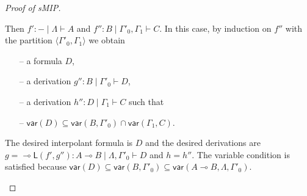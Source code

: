 \documentclass[sn-mathphys-num]{sn-jnl}%
\newcommand{\GG}{\Gamma}
\newcommand{\GL}{\Lambda}
\newcommand{\vd}{\vdash}
\newcommand{\lolli}{\multimap}
\newcommand{\lleft}{{\lolli}\mathsf{L}}
\newcommand{\mf}[1]{\mathsf{#1}}
\newcommand{\vars}[1]{\mf{var} (#1)}
\newcommand{\sMIP}{\textsf{sMIP}}
\theoremstyle{thmstyleone}%
\theoremstyle{thmstyletwo}%
\theoremstyle{thmstylethree}%
\begin{document}
\begin{proof}[Proof of \sMIP]
\begin{itemize}
    Then $f' : {-} \mid \GL \vd A$ and $f'' : B \mid \GG'_0 , \GG_1 \vd C$.
    In this case, by induction on $f''$ with the partition $\langle \GG'_0 , \GG_1 \rangle$ we obtain
    \begin{itemize}
      \item[--]  a formula $D$,
      \item[--] a derivation $g'' : B \mid \GG'_0 \vd D$,
      \item[--] a derivation $h'' : D \mid \GG_1 \vd C$ such that 
      \item[--] $\vars{D} \subseteq \vars{B , \GG'_0} \cap \vars{\GG_1 , C}$.
    \end{itemize}
    The desired interpolant formula is $D$ and the desired derivations are $g = \lleft (f' , g'') : A \lolli B \mid \GL , \GG'_0 \vd D$ and $h = h''$.
    The variable condition is satisfied because $\vars{D} \subseteq \vars{B , \GG'_0} \subseteq \vars{A \lolli B , \GL , \GG'_0}$.
    

\end{itemize}
\end{proof}
\end{document}
